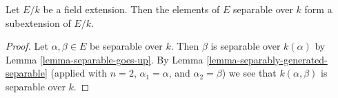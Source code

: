\begin{lemma}
\label{lemma-separable-elements}
Let $E/k$ be a field extension. Then the elements of $E$ separable
over $k$ form a subextension of $E/k$.
\end{lemma}

\begin{proof}
Let $\alpha, \beta \in E$ be separable over $k$. Then $\beta$ is separable
over $k(\alpha)$ by Lemma \ref{lemma-separable-goes-up}.
By Lemma \ref{lemma-separably-generated-separable} (applied with $n = 2$,
$\alpha_1 = \alpha$, and $\alpha_2 = \beta$) we see that
$k(\alpha, \beta)$ is separable over $k$.
\end{proof}





